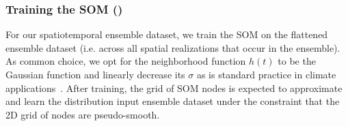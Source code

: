 \subsubsection{Training the SOM ()}
%
%
%
%
%
%
For our spatiotemporal ensemble dataset, we train the SOM on the flattened ensemble dataset (i.e. across all spatial realizations that occur in the ensemble).
%
As common choice, we opt for the neighborhood function $h(t)$ to be the Gaussian function and linearly decrease its $\sigma$ as is standard practice in climate applications~\cite{gibson_use_2017}.
%
After training, the grid of SOM nodes is expected to approximate and learn the distribution input ensemble dataset under the constraint that the 2D grid of nodes are pseudo-smooth.

